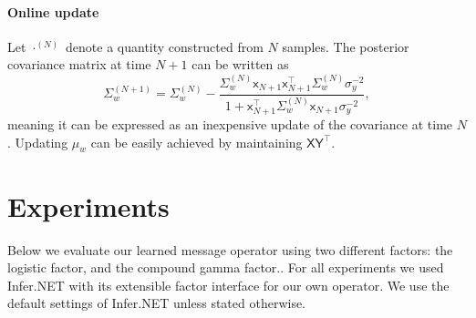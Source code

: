 \documentclass[english]{article}
\theoremstyle{plain}
\theoremstyle{plain}
\newcommand{\feax}{\mathsf{x}}
\newcommand{\feaX}{\mathsf{X}}
\newcommand{\feay}{\mathsf{y}}
\newcommand{\feaY}{\mathsf{Y}}
\newcommand{\wjnote}[1]{ }
\begin{document}
\paragraph{Online update}
Let $\cdot^{(N)}$ denote a quantity constructed from $N$ samples. The posterior
covariance matrix at time $N+1$ can be written as
%
\begin{equation}
\Sigma_{w}^{(N+1)} 
 =
\Sigma_{w}^{(N)}-\frac{\Sigma_{w}^{(N)} \mathsf{x}_{N+1} \mathsf{x}_{N+1}^{\top} \Sigma_{w}^{(N)}\sigma_{y}^{-2}}{1+ \mathsf{x}_{N+1}^{\top}\Sigma_{w}^{(N)} \mathsf{x}_{N+1}\sigma_{y}^{-2}},
\end{equation}
meaning it can be expressed as an inexpensive update of the covariance at time
$N$.
Updating $\mu_{w}$ can be easily achieved by maintaining  $\feaX \feaY^{\top}$. 



\section{Experiments  \label{sec:Experiments}}

Below we evaluate our learned message operator using two different factors: the
logistic factor, and the compound gamma factor..  For all experiments we used
Infer.NET \citep{Minka2014} with its extensible factor interface for our own
operator.  We use the default settings of Infer.NET unless stated otherwise.  
\end{document}

